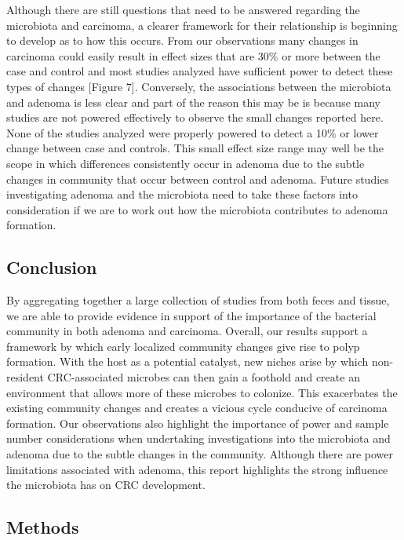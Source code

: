 \documentclass[12pt,]{article}
\begin{document}
Although there are still questions that need to be answered regarding
the microbiota and carcinoma, a clearer framework for their relationship
is beginning to develop as to how this occurs. From our observations
many changes in carcinoma could easily result in effect sizes that are
30\% or more between the case and control and most studies analyzed have
sufficient power to detect these types of changes {[}Figure 7{]}.
Conversely, the associations between the microbiota and adenoma is less
clear and part of the reason this may be is because many studies are not
powered effectively to observe the small changes reported here. None of
the studies analyzed were properly powered to detect a 10\% or lower
change between case and controls. This small effect size range may well
be the scope in which differences consistently occur in adenoma due to
the subtle changes in community that occur between control and adenoma.
Future studies investigating adenoma and the microbiota need to take
these factors into consideration if we are to work out how the
microbiota contributes to adenoma formation.

\newpage

\subsection{Conclusion}\label{conclusion}

By aggregating together a large collection of studies from both feces
and tissue, we are able to provide evidence in support of the importance
of the bacterial community in both adenoma and carcinoma. Overall, our
results support a framework by which early localized community changes
give rise to polyp formation. With the host as a potential catalyst, new
niches arise by which non-resident CRC-associated microbes can then gain
a foothold and create an environment that allows more of these microbes
to colonize. This exacerbates the existing community changes and creates
a vicious cycle conducive of carcinoma formation. Our observations also
highlight the importance of power and sample number considerations when
undertaking investigations into the microbiota and adenoma due to the
subtle changes in the community. Although there are power limitations
associated with adenoma, this report highlights the strong influence the
microbiota has on CRC development.

\newpage

\subsection{Methods}\label{methods}
\end{document}
